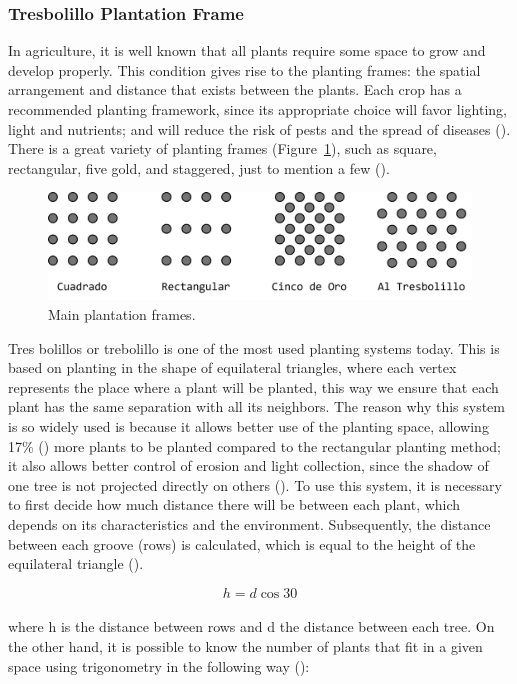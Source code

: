 \documentclass{amsart}
\begin{document}
            \subsubsection{Tresbolillo Plantation Frame}
            In agriculture, it is well known that all plants require some space to grow and develop properly. This condition gives rise to the planting frames: the spatial arrangement and distance that exists between the plants. Each crop has a recommended planting framework, since its appropriate choice will favor lighting, light and nutrients; and will reduce the risk of pests and the spread of diseases (\cite{Balam2022}). There is a great variety of planting frames (Figure~\ref{fig:MarcosDePlantación}), such as square, rectangular, five gold, and staggered, just to mention a few (\cite{Balam2022}).
            
            \begin{figure}[ht]
                \centering
                \includegraphics[width=0.8\linewidth]{Sources/figura1.png}
                \caption{Main plantation frames.}\label{fig:MarcosDePlantación}
            \end{figure}
            
            Tres bolillos or trebolillo is one of the most used planting systems today. This is based on planting in the shape of equilateral triangles, where each vertex represents the place where a plant will be planted, this way we ensure that each plant has the same separation with all its neighbors. The reason why this system is so widely used is because it allows better use of the planting space, allowing 17\% (\cite{Anonimo1}) more plants to be planted compared to the rectangular planting method; it also allows better control of erosion and light collection, since the shadow of one tree is not projected directly on others (\cite{Iglesias}).
            To use this system, it is necessary to first decide how much distance there will be between each plant, which depends on its characteristics and the environment. Subsequently, the distance between each groove (rows) is calculated, which is equal to the height of the equilateral triangle (\cite{Guerrero2018}).

            \begin{equation}
                h = d\cos{30}
            \end{equation}
            \\
            where h is the distance between rows and d the distance between each tree. On the other hand, it is possible to know the number of plants that fit in a given space using trigonometry in the following way (\cite{Carbo}):
\end{document}
